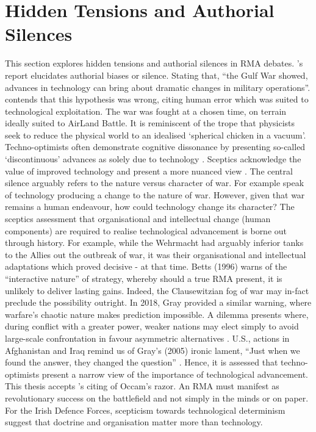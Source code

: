 \section{Hidden Tensions and Authorial Silences}


This section explores hidden tensions and authorial silences in RMA debates. \textcite{HUNDLEY_1999}'s report elucidates authorial biases or silence. Stating that, ``the Gulf War showed, advances in technology can bring about dramatic changes in military operations''.  \textcite{BIDDLE_1996} contends that this hypothesis was wrong, citing human error which was suited to technological exploitation. The war was fought at a chosen time, on terrain ideally suited to AirLand Battle. It is reminiscent of the trope that physicists seek to reduce the physical world to an idealised `spherical chicken in a vacuum'. Techno-optimists often demonstrate cognitive dissonance by presenting so-called `discontinuous' advances as solely due to technology \parencite{HUNDLEY_1999,KREPINEVICH_1992,KREPINEVICH_1994,KREPINEVICH_1996,OWENS_1996,OWENS_2000,OWENS_2002,COHEN_1995,COHEN_1996}. Sceptics acknowledge the value of improved technology and present a more nuanced view \parencite{BETTS_1996,BROSE_2019,GRAY_2005,ALACH_2008A}. The central silence arguably refers to the nature versus character of war. For example \textcite{HUNDLEY_1999,KREPINEVICH_1992} speak of technology producing a change to the nature of war. However, given that war remains a human endeavour, how could technology change its character? The sceptics assessment that organisational and intellectual change (human components) are required to realise technological advancement is borne out through history. For example, while the Wehrmacht had arguably inferior tanks to the Allies out the outbreak of war, it was their organisational and intellectual adaptations which proved decisive - at that time. Betts (1996) warns of the ``interactive nature'' of strategy, whereby should a true RMA present, it is unlikely to deliver lasting gains\nocite{BETTS_1996}. Indeed, the Clausewitzian fog of war may in-fact preclude the possibility outright. In 2018, Gray provided a similar warning, \nocite{GRAY_2005,GRAY_2018} where warfare's chaotic nature makes prediction impossible. A dilemma presents where, during conflict with a greater power, weaker nations may elect simply to avoid large-scale confrontation in favour asymmetric alternatives \parencite{JORD_2003}. U.S., actions in Afghanistan and Iraq remind us of Gray's (2005) ironic lament, ``Just when we found the answer, they changed the question'' \nocite{GRAY_2005}. Hence, it is assessed that techno-optimists present a narrow view of the importance of technological advancement. This thesis accepts \textcite{ALACH_2008A}'s citing of Occam's razor. An RMA must manifest as revolutionary success on the battlefield and not simply in the minds or on paper. For the Irish Defence Forces, scepticism towards technological determinism suggest that doctrine and organisation matter more than technology.

